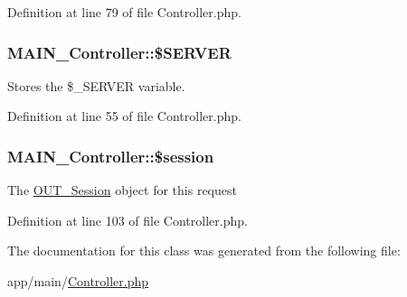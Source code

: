 Definition at line 79 of file Controller.php.\hypertarget{classMAIN__Controller_a95325660c51e8672302c6ddfe8df58c2}{
\subsubsection[{\$SERVER}]{\setlength{\rightskip}{0pt plus 5cm}MAIN\_\-Controller::\$SERVER}}
\label{d0/d6f/classMAIN__Controller_a95325660c51e8672302c6ddfe8df58c2}
Stores the \$\_\-SERVER variable. 

Definition at line 55 of file Controller.php.\hypertarget{classMAIN__Controller_ac0e517c6f06f9cefa0c6e52ce0a6247a}{
\subsubsection[{\$session}]{\setlength{\rightskip}{0pt plus 5cm}MAIN\_\-Controller::\$session}}
\label{d0/d6f/classMAIN__Controller_ac0e517c6f06f9cefa0c6e52ce0a6247a}
The \hyperlink{classOUT__Session}{OUT\_\-Session} object for this request 

Definition at line 103 of file Controller.php.

The documentation for this class was generated from the following file:\begin{DoxyCompactItemize}
\item 
app/main/\hyperlink{Controller_8php}{Controller.php}\end{DoxyCompactItemize}
